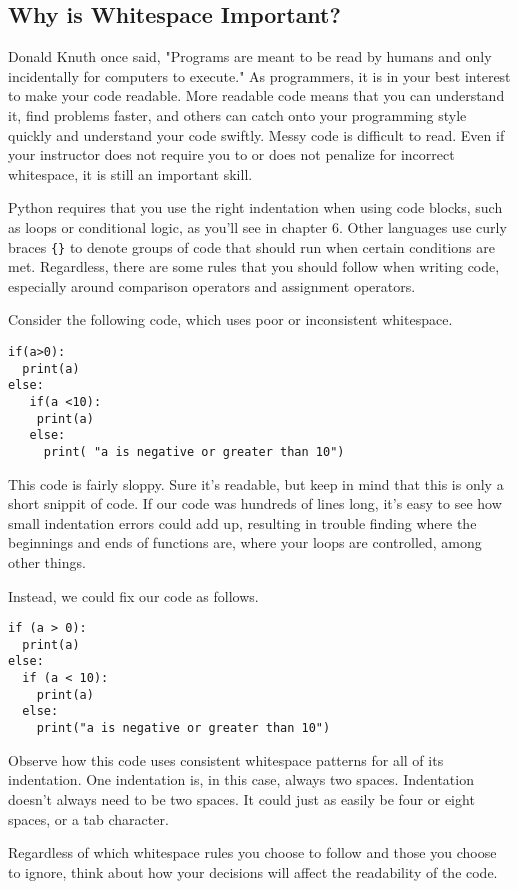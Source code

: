 \subsection{Why is Whitespace Important?}
Donald Knuth once said, "Programs are meant to be read by humans and only incidentally for computers to execute." As programmers, it is in your best interest to make your code readable. More readable code means that you can understand it, find problems faster, and others can catch onto your programming style quickly and understand your code swiftly. Messy code is difficult to read. Even if your instructor does not require you to or does not penalize for incorrect whitespace, it is still an important skill.\par
Python requires that you use the right indentation when using code blocks, such as loops or conditional logic, as you'll see in chapter 6. Other languages use curly braces \verb|{}| to denote groups of code that should run when certain conditions are met. Regardless, there are some rules that you should follow when writing code, especially around comparison operators and assignment operators.\par
Consider the following code, which uses poor or inconsistent whitespace.\par
\begin{lstlisting}[style=pippython]
if(a>0):
  print(a)
else:
   if(a <10):
    print(a)
   else:
     print( "a is negative or greater than 10")
\end{lstlisting}
This code is fairly sloppy. Sure it's readable, but keep in mind that this is only a short snippit of code. If our code was hundreds of lines long, it's easy to see how small indentation errors could add up, resulting in trouble finding where the beginnings and ends of functions are, where your loops are controlled, among other things.\par
Instead, we could fix our code as follows.\par
\begin{lstlisting}[style=pippython]
if (a > 0):
  print(a)
else:
  if (a < 10):
    print(a)
  else:
    print("a is negative or greater than 10")
\end{lstlisting}
Observe how this code uses consistent whitespace patterns for all of its indentation. One indentation is, in this case, always two spaces. Indentation doesn't always need to be two spaces. It could just as easily be four or eight spaces, or a tab character.\par
Regardless of which whitespace rules you choose to follow and those you choose to ignore, think about how your decisions will affect the readability of the code. \par
